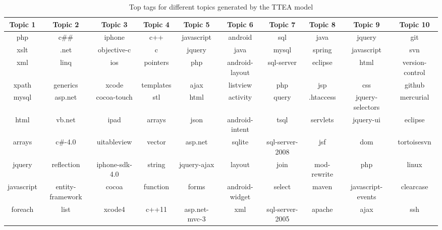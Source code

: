 {{{{{{{\begin{sidewaystable}
\caption{Top tags for different topics generated by the TTEA model}
\label{tab:toptagsp}
\centering
\scriptsize
\begin{tabular}{cccccccccc}
\hline
Topic 1& Topic 2& Topic 3& Topic 4 & Topic 5 & Topic 6& Topic 7 & Topic 8 &Topic 9 & Topic 10\\
\hline
php&c##&iphone&c++&javascript&android&sql&java&jquery&git \\ 
xslt&.net&objective-c&c&jquery&java&mysql&spring&javascript&svn \\ 
xml&linq&ios&pointers&php&android-layout&sql-server&eclipse&html&version-control \\ 
xpath&generics&xcode&templates&ajax&listview&php&jsp&css&github \\ 
mysql&asp.net&cocoa-touch&stl&html&activity&query&.htaccess&jquery-selectors&mercurial \\ 
html&vb.net&ipad&arrays&json&android-intent&tsql&servlets&jquery-ui&eclipse \\ 
arrays&c#-4.0&uitableview&vector&asp.net&sqlite&sql-server-2008&jsf&dom&tortoisesvn \\ 
jquery&reflection&iphone-sdk-4.0&string&jquery-ajax&layout&join&mod-rewrite&php&linux \\ 
javascript&entity-framework&cocoa&function&forms&android-widget&select&maven&javascript-events&clearcase \\ 
foreach&list&xcode4&c++11&asp.net-mvc-3&xml&sql-server-2005&apache&ajax&ssh \\
\hline
\end{tabular}
\end{sidewaystable}

}}}}}}}
